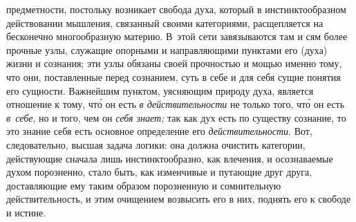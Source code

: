 предметности, постольку возникает свобода духа, который в инстинктообразном
действовании мышления, связанный своими категориями, расщепляется на бесконечно
многообразную материю. В~этой сети завязываются там и сям более прочные узлы,
служащие опорными и направляющими пунктами его (духа) жизни и сознания; эти
узлы обязаны своей прочностью и мощью именно тому, что они, поставленные перед
сознанием, суть в себе и для себя сущие понятия его сущности. Важнейшим
пунктом, уясняющим природу духа, является отношение к тому, чт\'{о} он есть
{\em в действительности} не только того, чт\'{о} он есть {\em в~себе}, но и
того, чем он {\em себя знает;} так как дух есть по существу сознание, то это
знание себя есть основное определение его {\em действительности}. Вот,
следовательно, высшая задача логики: она должна очистить категории, действующие
сначала лишь инстинктообразно, как влечения, и осознаваемые духом порозненно,
стало быть, как изменчивые и путающие друг друга, доставляющие ему таким
образом порозненную и сомнительную действительность, и этим очищением возвысить
его в них, поднять его к свободе и истине.

